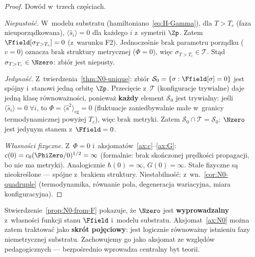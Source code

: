\begin{proof}
Dow\'od w~trzech cz\k{e}\'sciach.

\emph{Niepusto\'s\'c.}\;
W~modelu substratu (hamiltoniano~\ref{eq:H-Gamma}), dla $T > T_c$
(faza nieuporz\k{a}dkowana), $\langle\hat{s}_i\rangle = 0$ dla
ka\.zdego $i$ z~symetrii $\Zp$. Zatem $\Ffield[\sigma_{T>T_c}] = 0$
(z~warunku F2). Jednocze\'snie brak parametru porz\k{a}dku ($v = 0$)
oznacza brak struktury metrycznej ($\Phi = 0$), wi\k{e}c
$\sigma_{T>T_c} \in \mathcal{T}$. St\k{a}d
$\sigma_{T>T_c} \in \Nzero$: zbi\'or jest niepusty.

\emph{Jedyno\'s\'c.}\;
Z~twierdzenia~\ref{thm:N0-unique}: zbi\'or $\mathcal{S}_0
= \{\sigma : \Ffield[\sigma] = 0\}$ jest sp\'ojny
i~stanowi jedn\k{a} orbit\k{e} $\Zp$.
Przeci\k{e}cie z~$\mathcal{T}$ (konfiguracje trywialne)
daje jedn\k{a} klas\k{e} r\'ownowa\.zno\'sci, poniewa\.z
\textbf{ka\.zdy} element $\mathcal{S}_0$ jest trywialny:
je\'sli $\langle\hat{s}_i\rangle = 0\;\forall i$, to
$\Phi = \langle\hat{s}^2\rangle_{\mathrm{cg}} = 0$
(fluktuacje zaniedbywalnie ma\l{}e w~granicy termodynamicznej
powy\.zej $T_c$), wi\k{e}c brak metryki.
Zatem $\mathcal{S}_0 \cap \mathcal{T} = \mathcal{S}_0$:
$\Nzero$ jest jedynym stanem z~$\Ffield = 0$.

\emph{W\l{}asno\'sci fizyczne.}\;
Z~$\Phi = 0$ i~aksjomat\'ow~\ref{ax:c}--\ref{ax:G}:
$c(0) = c_0(\PhiZero/0)^{1/2} = \infty$
(formalnie: brak sko\'nczonej pr\k{e}dko\'sci propagacji,
bo nie ma metryki). Analogicznie $\hbar(0) = \infty$,
$G(0) = \infty$. Sta\l{}e fizyczne s\k{a} nieokre\'slone ---
sp\'ojne z~brakiem struktury.
Niestabilno\'s\'c: z~wn.~\ref{cor:N0-quadruple}
(termodynamika, r\'ownanie pola, degeneracja wariacyjna,
miara konfiguracyjna).
\end{proof}

\begin{remark}\label{rem:N0-aksjomat-vs-twierdzenie}
Stwierdzenie~\ref{prop:N0-from-F} pokazuje, \.ze $\Nzero$ jest
\textbf{wyprowadzalny} z~w\l{}asno\'sci funkcji stanu $\Ffield$
i~modelu substratu. Aksjomat~\ref{ax:N0} mo\.zna zatem traktowa\'c
jako \textbf{skr\'ot poj\k{e}ciowy}: jest logicznie r\'ownowa\.zny
istnieniu fazy niemetrycznej substratu. Zachowujemy go jako aksjomat
ze wzgl\k{e}d\'ow pedagogicznych --- bezpo\'srednio wprowadza
centralny byt teorii.
\end{remark}

